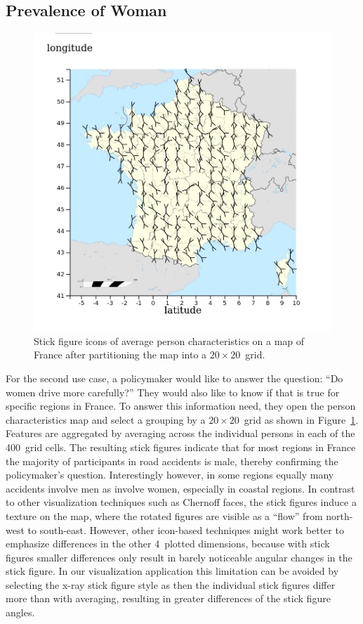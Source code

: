 \subsection{Prevalence of Woman}
\begin{figure}
    \centering
    \includegraphics[width=0.6\linewidth]{figures/stick-figures-by-grid-20-20-average}
    \caption{Stick figure icons of average person characteristics on a map of France after partitioning the map into a \(20 \times 20\)~grid.}
    \label{figure-stick-figures-grid-average}
\end{figure}
For the second use case, a policymaker would like to answer the question: \enquote{Do women drive more carefully?} They would also like to know if that is true for specific regions in France.
To answer this information need, they open the person characteristics map and select a grouping by a \(20 \times 20\)~grid as shown in Figure~\ref{figure-stick-figures-grid-average}.
Features are aggregated by averaging across the individual persons in each of the 400~grid cells. The resulting stick figures indicate that for most regions in France the majority of participants in road accidents is male, thereby confirming the policymaker's question.
Interestingly however, in some regions equally many accidents involve men as involve women, especially in coastal regions.
In contrast to other visualization techniques such as Chernoff faces, the stick figures induce a texture on the map, where the rotated figures are visible as a \enquote{flow} from north-west to south-east.
However, other icon-based techniques might work better to emphasize differences in the other 4~plotted dimensions, because with stick figures smaller differences only result in barely noticeable angular changes in the stick figure.
In our visualization application this limitation can be avoided by selecting the x-ray stick figure style as then the individual stick figures differ more than with averaging, resulting in greater differences of the stick figure angles.

